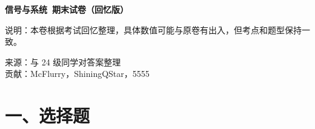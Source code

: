 \documentclass[10pt,a4paper]{ctexart}
\begin{document}
\begin{center}
  {\LARGE\bfseries 信号与系统\ 期末试卷（回忆版）}

  \vspace{0.4cm}
  {\large 说明：本卷根据考试回忆整理，具体数值可能与原卷有出入，但考点和题型保持一致。}

  \vspace{0.25cm}
  {\normalsize
  来源：与 24 级同学对答案整理\\[2pt]
  贡献：McFlurry，ShiningQStar，5555}
\end{center}

\vspace{0.3cm}

\section*{一、选择题}
\end{document}
